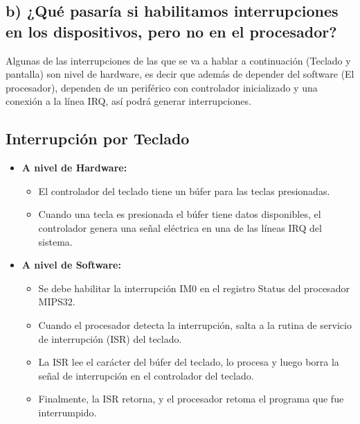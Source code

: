 \documentclass{article}
\begin{document}
{{\subsection*{b) ¿Qué pasaría si habilitamos interrupciones en los dispositivos, pero no en el procesador?}

\quad

{Algunas de las interrupciones de las que se va a hablar a continuación (Teclado y pantalla) son nivel de hardware, es decir que además de depender del software (El procesador), dependen de un periférico con controlador inicializado y una conexión a la línea IRQ, así podrá generar interrupciones.}

\subsection{Interrupción por Teclado}
\begin{itemize}
    \item \textbf{A nivel de Hardware:}
    \begin{itemize}
        \item El controlador del teclado tiene un búfer para las teclas presionadas.
        \item Cuando una tecla es presionada el búfer tiene datos disponibles, el controlador genera una señal eléctrica en una de las líneas IRQ del sistema.
    \end{itemize}
    \item \textbf{A nivel de Software:}
    \begin{itemize}
        \item Se debe habilitar la interrupción IM0 en el registro Status del procesador MIPS32.
        \item Cuando el procesador detecta la interrupción, salta a la rutina de servicio de interrupción (ISR) del teclado.
        \item La ISR lee el carácter del búfer del teclado, lo procesa y luego borra la señal de interrupción en el controlador del teclado.
         \item Finalmente, la ISR retorna, y el procesador retoma el programa que fue interrumpido.

    \end{itemize}
\end{itemize}

}}
\end{document}
